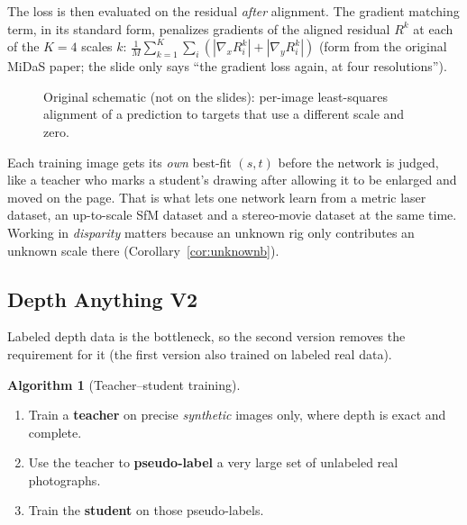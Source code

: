 \documentclass[11pt,a4paper]{article}
\theoremstyle{definition}
\newtheorem{algorithm}{Algorithm}[section]
\theoremstyle{plain}
\theoremstyle{remark}
\begin{document}
The loss is then evaluated on the residual \emph{after} alignment. The gradient matching term, in its standard form, penalizes gradients of the aligned residual $R^k$ at each of the $K=4$ scales $k$: $\frac1M\sum_{k=1}^{K}\sum_i(|\nabla_xR^k_i|+|\nabla_yR^k_i|)$ (form from the original MiDaS paper; the slide only says ``the gradient loss again, at four resolutions'').
 
\begin{figure}[htbp]
\centering
{}
\caption{Original schematic (not on the slides): per-image least-squares alignment of a prediction to targets that use a different scale and zero.}
\end{figure}
 
\begin{intuition}
Each training image gets its \emph{own} best-fit $(s,t)$ before the network is judged, like a teacher who marks a student's drawing after allowing it to be enlarged and moved on the page. That is what lets one network learn from a metric laser dataset, an up-to-scale SfM dataset and a stereo-movie dataset at the same time. Working in \emph{disparity} matters because an unknown rig only contributes an unknown scale there (Corollary~\ref{cor:unknownb}).
\end{intuition}
 
\subsection{Depth Anything V2 }
 
Labeled depth data is the bottleneck, so the second version removes the requirement for it (the first version also trained on labeled real data).
 
\begin{algorithm}[Teacher--student training]
\begin{enumerate}[nosep]
\item Train a \textbf{teacher} on precise \emph{synthetic} images only, where depth is exact and complete.
\item Use the teacher to \textbf{pseudo-label} a very large set of unlabeled real photographs.
\item Train the \textbf{student} on those pseudo-labels.
\end{enumerate}
\end{algorithm}
 
\end{document}

